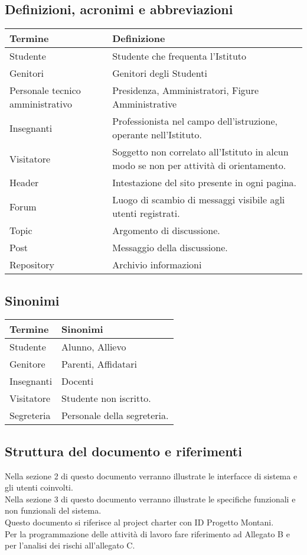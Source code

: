\documentclass{article}
\begin{document}
	\subsection{\textbf{Definizioni, acronimi e abbreviazioni}}
	\begin{tabular}{ |p{3cm}|p{8cm}|  }
	\hline
	\textbf{Termine}& \textbf{Definizione}\\
	\hline
	Studente   & Studente che frequenta l'Istituto  \\
	\hline
	Genitori & Genitori degli Studenti \\
	\hline
	Personale tecnico amministrativo & Presidenza, Amministratori, Figure Amministrative \\
	\hline
	Insegnanti   &  Professionista nel campo dell'istruzione, operante nell'Istituto.  \\
	\hline
	Visitatore  & Soggetto non correlato all'Istituto in alcun modo se non per attività di orientamento. \\	
	\hline
	Header & Intestazione del sito presente in ogni pagina. \\
	\hline
	Forum & Luogo di scambio di messaggi visibile agli utenti registrati.\\
		\hline
	Topic & Argomento di discussione.\\
		\hline
	Post & Messaggio della discussione. \\
		\hline
	Repository & Archivio informazioni\\
	\hline
\end{tabular}
	
	\subsection{\textbf{Sinonimi}}
\begin{tabular}{ |p{3cm}|p{8cm}|  }
	\hline
	\textbf{Termine}& \textbf{Sinonimi}\\
	\hline
	Studente   & Alunno, Allievo  \\
	\hline
	Genitore   &  Parenti, Affidatari \\
	\hline
	Insegnanti  & Docenti\\	
	\hline
	Visitatore   & Studente non iscritto.  \\
	\hline
	Segreteria   & Personale della segreteria.  \\
\hline
\end{tabular}
	
	\subsection{\textbf{Struttura del documento e riferimenti}}
	Nella sezione 2 di questo documento verranno illustrate le interfacce di sistema e gli utenti coinvolti.\\
	Nella sezione 3 di questo documento verranno illustrate le specifiche funzionali e non funzionali del sistema.\\
	Questo documento si riferisce al project charter con ID Progetto Montani.\\
	Per la programmazione delle attività di lavoro fare riferimento ad Allegato B e per l'analisi dei rischi all'allegato C.\\
	
\end{document}
